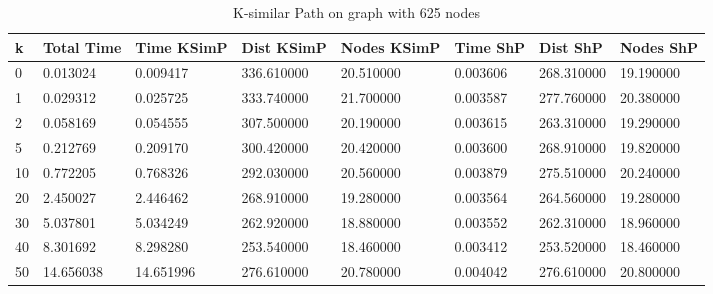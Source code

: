 \documentclass[]{article}
\numberwithin{equation}{section}
\begin{document}
\begin{appendices}
\begin{table}[H]
	\centering
	\small
	\setlength\tabcolsep{2pt}
	\begin{tabular}{|l|l|l|l|l|l|l|l|}
		\hline
		k  & Total Time & Time KSimP & Dist KSimP & Nodes KSimP & Time ShP & Dist ShP   & Nodes ShP \\ \hline
		0  & 0.013024   & 0.009417   & 336.610000 & 20.510000   & 0.003606 & 268.310000 & 19.190000 \\ \hline
		1  & 0.029312   & 0.025725   & 333.740000 & 21.700000   & 0.003587 & 277.760000 & 20.380000 \\ \hline
		2  & 0.058169   & 0.054555   & 307.500000 & 20.190000   & 0.003615 & 263.310000 & 19.290000 \\ \hline
		5  & 0.212769   & 0.209170   & 300.420000 & 20.420000   & 0.003600 & 268.910000 & 19.820000 \\ \hline
		10 & 0.772205   & 0.768326   & 292.030000 & 20.560000   & 0.003879 & 275.510000 & 20.240000 \\ \hline
		20 & 2.450027   & 2.446462   & 268.910000 & 19.280000   & 0.003564 & 264.560000 & 19.280000 \\ \hline
		30 & 5.037801   & 5.034249   & 262.920000 & 18.880000   & 0.003552 & 262.310000 & 18.960000 \\ \hline
		40 & 8.301692   & 8.298280   & 253.540000 & 18.460000   & 0.003412 & 253.520000 & 18.460000 \\ \hline
		50 & 14.656038  & 14.651996  & 276.610000 & 20.780000   & 0.004042 & 276.610000 & 20.800000 \\ \hline
	\end{tabular}
	\caption{K-similar Path on graph with 625 nodes}
\end{table}


\end{appendices}
\end{document}
